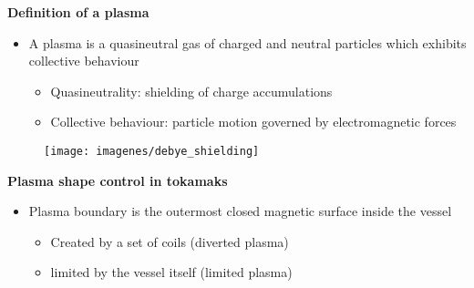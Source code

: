 \documentclass[10pt]{beamer}
\begin{document}
\begin{frame}{\bf Definition of a plasma}

\begin{minipage}{0.55\textwidth}

\begin{itemize}

\item A plasma is a quasineutral gas of charged and neutral particles which exhibits collective behaviour

\begin{itemize}

\item Quasineutrality: shielding of charge accumulations

\item Collective behaviour: particle motion governed by electromagnetic forces

\end{itemize}
\end{itemize}
\end{minipage}
%
\hfill
%
\begin{minipage}{0.4\textwidth}
\begin{figure}[htbp]
\texttt{[image: imagenes/debye\_shielding]}
\end{figure}
\end{minipage}

\end{frame}

\begin{frame}{\bf Plasma shape control in tokamaks}
	\begin{itemize}
		\item Plasma boundary is the outermost closed magnetic surface inside the vessel

		\begin{itemize}
			\item Created by a set of coils (diverted plasma)
			\item limited by the vessel itself (limited plasma)
		\end{itemize}
	\end{itemize}
	
	\begin{figure}[htbp]
		\centering
		\hfill
	\end{figure}
\end{frame}
\end{document}
